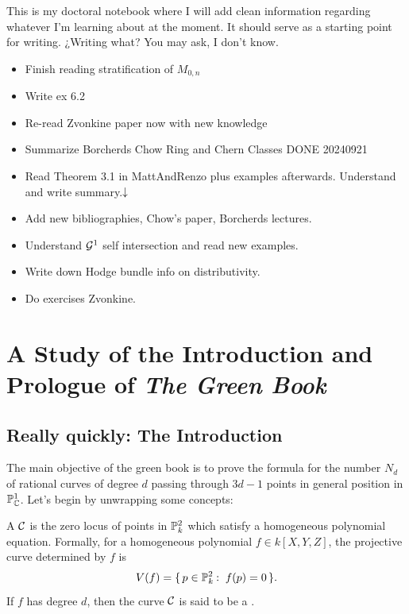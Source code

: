 \documentclass[12pt]{memoir}
\author{\nauthor}
\begin{document}
{\small 
\setlength{\parindent}{0em}
\setlength{\parskip}{1em}

This is my doctoral notebook where I will add clean information regarding whatever I'm learning about at the moment. It should serve as a starting point for writing. ¿Writing what? You may ask, I don't know.

\begin{itemize}
    \item Finish reading stratification of $M_{0,n}$
    \item Write ex 6.2
    \item Re-read Zvonkine paper now with new knowledge
    \item Summarize Borcherds Chow Ring and Chern Classes DONE 20240921
\end{itemize}
\begin{itemize}
    \item Read Theorem 3.1 in MattAndRenzo plus examples afterwards. Understand and write summary.$\downarrow$
    \item Add new bibliographies, Chow's paper, Borcherds lectures.
\end{itemize}
\begin{itemize}
    \item Understand $\mathcal{G}^1$ self intersection and read new examples.
    \item Write down Hodge bundle info on distributivity.
    \item Do exercises Zvonkine.
\end{itemize}
}
\newpage
\tableofcontents
\chapter{A Study of the Introduction and Prologue of \emph{The Green Book}}

\section{Really quickly: The Introduction}

The main objective of the green book is to prove the formula for the number $N_d$ of rational curves of degree $d$ passing through $3d-1$ points in general position in $\mathbb{P}_{\mathbb{C}}^1$. Let's begin by unwrapping some concepts:

\begin{Def}
A  $\mathcal{C}$ is the zero locus of points in $\mathbb{P}^2_k$ which satisfy a homogeneous polynomial equation. Formally, for a homogeneous polynomial $f\in k[X,Y,Z]$, the projective curve determined by $f$ is
$$V(f)=\set{p\in\bP^2_k\:\ f(p)=0}.$$
If $f$ has degree $d$, then the curve $\mathcal{C}$ is said to be a .
\end{Def}
\end{document}
